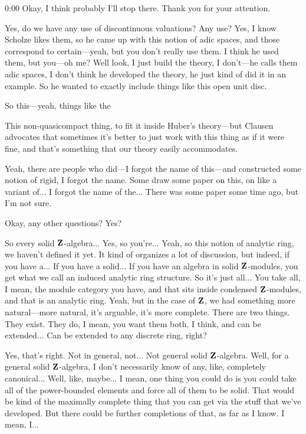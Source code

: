 \begin{unfinished}{0:00}
Okay, I think probably I'll stop there. Thank you for your attention.

Yes, do we have any use of discontinuous valuations? Any use? Yes, I know Scholze likes them, so he came up with this notion of adic spaces, and those correspond to certain---yeah, but you don't really use them. I think he used them, but you---oh me? Well look, I just build the theory, I don't---he calls them adic spaces, I don't think he developed the theory, he just kind of did it in an example. So he wanted to exactly include things like this open unit disc.

So this---yeah, things like the 

This non-quasicompact thing, to fit it inside Huber's theory---but Clausen advocates that sometimes it's better to just work with this thing as if it were fine, and that's something that our theory easily accommodates.

Yeah, there are people who did---I forgot the name of this---and constructed some notion of rigid, I forgot the name. Some draw some paper on this, on like a variant of... I forgot the name of the... There was some paper some time ago, but I'm not sure.

Okay, any other questions? Yes?

So every solid $\mathbf Z$-algebra... Yes, so you're... Yeah, so this notion of analytic ring, we haven't defined it yet. It kind of organizes a lot of discussion, but indeed, if you have a... If you have a solid... If you have an algebra in solid $\mathbf Z$-modules, you get what we call an induced analytic ring structure. So it's just all... You take all, I mean, the module category you have, and that sits inside condensed $\mathbf Z$-modules, and that is an analytic ring. Yeah, but in the case of $\mathbf Z$, we had something more natural---more natural, it's arguable, it's more complete. There are two things. They exist. They do, I mean, you want them both, I think, and can be extended... Can be extended to any discrete ring, right?

Yes, that's right. Not in general, not... Not general solid $\mathbf Z$-algebra. Well, for a general solid $\mathbf Z$-algebra, I don't necessarily know of any, like, completely canonical... Well, like, maybe... I mean, one thing you could do is you could take all of the power-bounded elements and force all of them to be solid. That would be kind of the maximally complete thing that you can get via the stuff that we've developed. But there could be further completions of that, as far as I know. I mean, I...


\end{unfinished}

